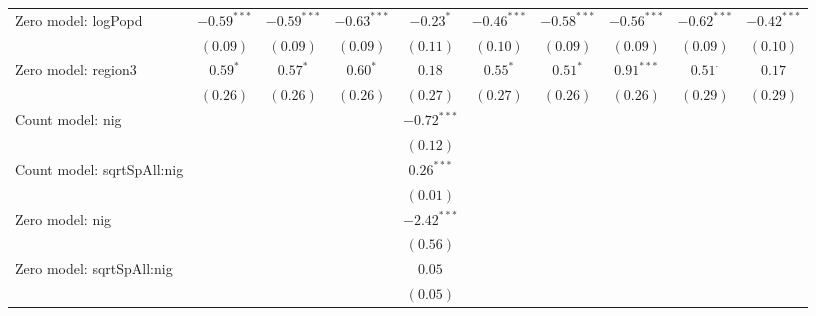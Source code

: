 \begin{center}
\begin{longtable}{l c c c c c c c c c}
Zero model: logPopd            & $-0.59^{***}$ & $-0.59^{***}$ & $-0.63^{***}$ & $-0.23^{*}$   & $-0.46^{***}$   & $-0.58^{***}$   & $-0.56^{***}$ & $-0.62^{***}$  & $-0.42^{***}$ \\
                               & $(0.09)$      & $(0.09)$      & $(0.09)$      & $(0.11)$      & $(0.10)$        & $(0.09)$        & $(0.09)$      & $(0.09)$       & $(0.10)$      \\
Zero model: region3            & $0.59^{*}$    & $0.57^{*}$    & $0.60^{*}$    & $0.18$        & $0.55^{*}$      & $0.51^{*}$      & $0.91^{***}$  & $0.51^{\cdot}$ & $0.17$        \\
                               & $(0.26)$      & $(0.26)$      & $(0.26)$      & $(0.27)$      & $(0.27)$        & $(0.26)$        & $(0.26)$      & $(0.29)$       & $(0.29)$      \\
Count model: nig               &               &               &               & $-0.72^{***}$ &                 &                 &               &                &               \\
                               &               &               &               & $(0.12)$      &                 &                 &               &                &               \\
Count model: sqrtSpAll:nig     &               &               &               & $0.26^{***}$  &                 &                 &               &                &               \\
                               &               &               &               & $(0.01)$      &                 &                 &               &                &               \\
Zero model: nig                &               &               &               & $-2.42^{***}$ &                 &                 &               &                &               \\
                               &               &               &               & $(0.56)$      &                 &                 &               &                &               \\
Zero model: sqrtSpAll:nig      &               &               &               & $0.05$        &                 &                 &               &                &               \\
                               &               &               &               & $(0.05)$      &                 &                 &               &                &               \\

\end{longtable}
\end{center}
